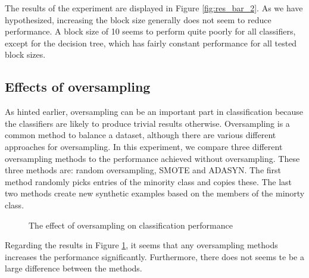 The results of the experiment are displayed in Figure \ref{fig:res_bar_2}. As we have hypothesized, increasing the block size generally does not seem to reduce performance. A block size of 10 seems to perform quite poorly for all classifiers, except for the decision tree, which has fairly constant performance for all tested block sizes.

\subsection{Effects of oversampling}
As hinted earlier, oversampling can be an important part in classification because the classifiers are likely to produce trivial results otherwise. Oversampling is a common method to balance a dataset, although there are various different approaches for oversampling. In this experiment, we compare three different oversampling methods to the performance achieved without oversampling. These three methods are: random oversampling, SMOTE and ADASYN. The first method randomly picks entries of the minority class and copies these. The last two methods create new synthetic examples based on the members of the minorty class.


\datathree

\begin{figure}
	\caption{The effect of oversampling on classification performance}
	\label{fig:res_bar_3}
\end{figure}

Regarding the results in Figure \ref{fig:res_bar_3}, it seems that any oversampling methods increases the performance significantly. Furthermore, there does not seems te be a large difference between the methods.

